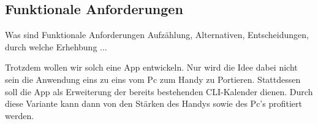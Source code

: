 \subsection{Funktionale Anforderungen}
Was sind Funktionale Anforderungen \newline
Aufzählung, Alternativen, Entscheidungen, durch welche Erhehbung ...

\myNewSection
Trotzdem wollen wir solch eine App entwickeln. Nur wird die Idee dabei nicht sein die Anwendung eins zu eins vom Pc zum Handy zu Portieren. Stattdessen soll die App als Erweiterung der bereits bestehenden CLI-Kalender dienen. Durch diese Variante kann dann von den Stärken des Handys sowie des Pc's profitiert werden. 